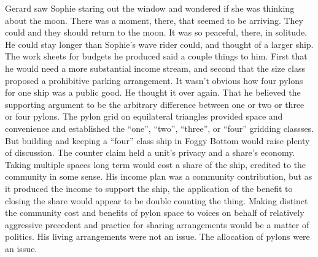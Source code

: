 

Gerard saw Sophie staring out the window and wondered if she was
thinking about the moon.  There was a moment, there, that seemed to be
arriving.  They could and they should return to the moon.  It was so
peaceful, there, in solitude.  He could stay longer than Sophie's wave
rider could, and thought of a larger ship.  The work sheets for
budgets he produced said a couple things to him.  First that he would
need a more substantial income stream, and second that the size class
proposed a prohibitive parking arrangement.  It wasn't obvious how
four pylons for one ship was a public good.  He thought it over again.
That he believed the supporting argument to be the arbitrary
difference between one or two or three or four pylons.  The pylon grid
on equilateral triangles provided space and convenience and
established the ``one'', ``two'', ``three'', or ``four'' gridding
classses.  But building and keeping a ``four'' class ship in Foggy
Bottom would raise plenty of discussion.  The counter claim held a
unit's privacy and a share's economy.  Taking multiple spaces long
term would cost a share of the ship, credited to the community in some
sense.  His income plan was a community contribution, but as it
produced the income to support the ship, the application of the
benefit to closing the share would appear to be double counting the
thing.  Making distinct the community cost and benefits of pylon space
to voices on behalf of relatively aggressive precedent and practice
for sharing arrangements would be a matter of politics.  His living
arrangements were not an issue.  The allocation of pylons were an
issue.

\bye

